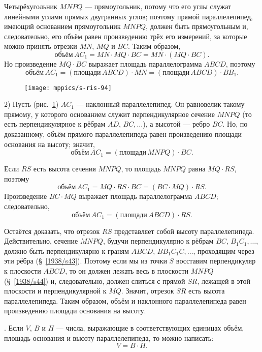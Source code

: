 Четырёхугольник $MNPQ$ — прямоугольник, потому что его углы служат линейными углами прямых двугранных углов;
поэтому прямой параллелепипед, имеющий основанием прямоугольник $MNPQ$, должен быть прямоугольным и, следовательно, его объём равен произведению трёх его измерений, за которые можно принять отрезки $MN$, $MQ$ и $BC$.
Таким образом,
\[\text{объём}\, AC_1 = MN\cdot MQ\cdot BC = MN\cdot (MQ\cdot BC).\]
Но произведение $MQ\cdot BC$ выражает площадь параллелограмма $ABCD$, поэтому
\[
\text{объём}\, AC_1
= (\text{площади}\, ABCD)\cdot MN
= (\text{площади}\, ABCD)\cdot BB_1.
\]

\begin{figure}[h!]%
\centering
\texttt{[image: mppics/s-ris-94]}
\caption{}\label{1938/s-ris-94}
\vskip-0mm
\end{figure}

2) Пусть (рис.~\ref{1938/s-ris-94}) $AC_1$ — наклонный параллелепипед.
Он равновелик такому прямому, у которого основанием служит перпендикулярное сечение $MNPQ$ (то есть перпендикулярное к рёбрам $AD$, $BC,\dots$), а высотой — ребро $BC$.
Но, по доказанному, объём прямого параллелепипеда равен произведению площади основания на высоту;
значит,
\[\text{объём}\, AC_1 = (\text{площади}\, MNPQ)\cdot BC.\]

Если $RS$ есть высота сечения $MNPQ$, то площадь $MNPQ$ равна $MQ\cdot RS$, поэтому
\[\text{объём}\, AC_1 = MQ\cdot RS\cdot BC = (BC\cdot MQ)\cdot RS.\]
Произведение $BC\cdot MQ$ выражает площадь параллелограмма $ABCD$;
следовательно, 
\[\text{объём}\, AC_1 =(\text{площади}\, ABCD) \cdot RS.\]

Остаётся доказать, что отрезок $RS$ представляет собой высоту параллелепипеда.
Действительно, сечение $MNPQ$, будучи перпендикулярно к рёбрам $BC$, $B_1C_1,\dots$, должно быть перпендикулярно к граням $ABCD$, $BB_1C_1C,\dots$, проходящим через эти рёбра (§~\ref{1938/s43}).
Поэтому если мы из точки $S$ восставим перпендикуляр к плоскости $ABCD$, то он должен лежать весь в плоскости $MNPQ$ (§~\ref{1938/s44}) и, следовательно, должен слиться с прямой $SR$, лежащей в этой плоскости и перпендикулярной к $MQ$.
Значит, отрезок $SR$ есть высота параллелепипеда.
Таким образом, объём и наклонного параллелепипеда равен произведению площади основания на высоту.

\medskip

.
Если $V$, $B$ и $H$ — числа, выражающие в соответствующих единицах объём, площадь основания и высоту параллелепипеда, то можно написать:
\[V = B\cdot H.\]

